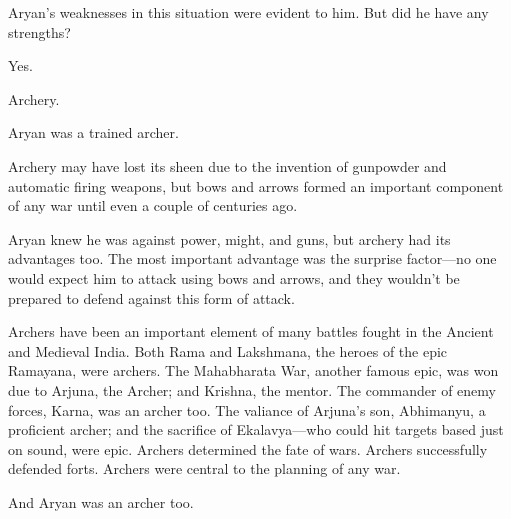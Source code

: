 Aryan's weaknesses in this situation were evident to him. But did he have any
strengths?

Yes.

Archery.

Aryan was a trained archer.

Archery may have lost its sheen due to the invention of gunpowder and automatic
firing weapons, but bows and arrows formed an important component of any war
until even a couple of centuries ago.

Aryan knew he was against power, might, and guns, but archery had its advantages
too. The most important advantage was the surprise factor—no one would expect
him to attack using bows and arrows, and they wouldn't be prepared to defend
against this form of attack.

Archers have been an important element of many battles fought in the Ancient and
Medieval India. Both Rama and Lakshmana, the heroes of the epic Ramayana, were
archers. The Mahabharata War, another famous epic, was won due to Arjuna, the
Archer; and Krishna, the mentor. The commander of enemy forces, Karna, was an
archer too. The valiance of Arjuna's son, Abhimanyu, a proficient archer; and
the sacrifice of Ekalavya—who could hit targets based just on sound, were
epic. Archers determined the fate of wars. Archers successfully defended forts.
Archers were central to the planning of any war.

And Aryan was an archer too.